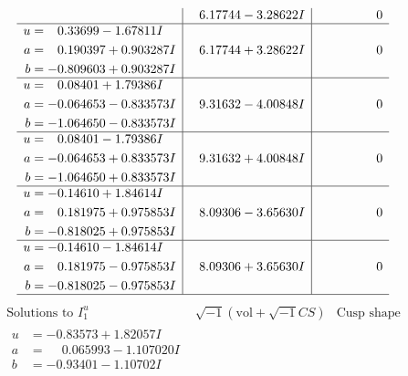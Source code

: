 \documentclass[1p]{elsarticle_modified}
\theoremstyle{definition}
\newcommand{\I}{\sqrt{-1}}
\begin{document}
$$\begin{array}{c|c|c}
 & \phantom{-}6.17744 - 3.28622 I & \phantom{-0.000000 } 0 \\ \hline\begin{aligned}
u &= \phantom{-}0.33699 - 1.67811 I \\
a &= \phantom{-}0.190397 + 0.903287 I \\
b &= -0.809603 + 0.903287 I\end{aligned}
 & \phantom{-}6.17744 + 3.28622 I & \phantom{-0.000000 } 0 \\ \hline\begin{aligned}
u &= \phantom{-}0.08401 + 1.79386 I \\
a &= -0.064653 - 0.833573 I \\
b &= -1.064650 - 0.833573 I\end{aligned}
 & \phantom{-}9.31632 - 4.00848 I & \phantom{-0.000000 } 0 \\ \hline\begin{aligned}
u &= \phantom{-}0.08401 - 1.79386 I \\
a &= -0.064653 + 0.833573 I \\
b &= -1.064650 + 0.833573 I\end{aligned}
 & \phantom{-}9.31632 + 4.00848 I & \phantom{-0.000000 } 0 \\ \hline\begin{aligned}
u &= -0.14610 + 1.84614 I \\
a &= \phantom{-}0.181975 + 0.975853 I \\
b &= -0.818025 + 0.975853 I\end{aligned}
 & \phantom{-}8.09306 - 3.65630 I & \phantom{-0.000000 } 0 \\ \hline\begin{aligned}
u &= -0.14610 - 1.84614 I \\
a &= \phantom{-}0.181975 - 0.975853 I \\
b &= -0.818025 - 0.975853 I\end{aligned}
 & \phantom{-}8.09306 + 3.65630 I & \phantom{-0.000000 } 0\\
 \hline 
 \end{array}$$\newpage$$\begin{array}{c|c|c}  
\text{Solutions to }I^u_{1}& \I (\text{vol} + \sqrt{-1}CS) & \text{Cusp shape}\\
 \hline 
\begin{aligned}
u &= -0.83573 + 1.82057 I \\
a &= \phantom{-}0.065993 - 1.107020 I \\
b &= -0.93401 - 1.10702 I\end{aligned}

\end{array}$$
\end{document}
